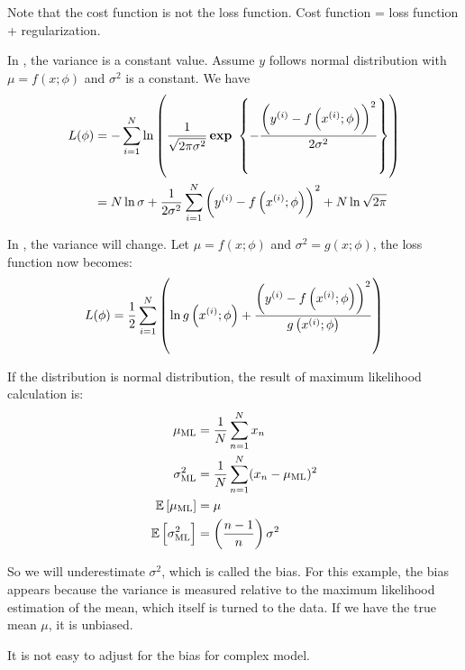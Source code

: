 Note that the cost function is not the loss function. Cost function = loss function + regularization.


In , the variance is a constant value. Assume $y$ follows normal distribution with $\mu = f(x;\phi)$ and $\sigma^2$ is a constant. We have 
\begin{equation}\label{homoscedastic_regression}
    \begin{aligned}
        L(\phi) &= - \sum_{i=1}^N \ln \left( \frac{1}{\sqrt{2\pi \sigma^2}} \mathop{\bf exp\/}~\set{- \frac{\left({y}^{(i)} - f\left({x}^{(i)};\phi\right)\right)^2}{2 \sigma^2}} \right) \\
        &= N \ln \sigma + \frac{1}{2 \sigma^2} \sum_{i=1}^N \left({y}^{(i)} - f\left({x}^{(i)};\phi\right)\right)^2 + N \ln \sqrt{2\pi}
    \end{aligned}
\end{equation}


In , the variance will change. Let $\mu = f(x;\phi)$ and $\sigma^2 = g(x;\phi)$, the loss function now becomes:
\begin{equation}
    L(\phi) = \frac{1}{2} \sum_{i=1}^N \left(\ln g\left({x}^{(i)};\phi\right) + \frac{\left({y}^{(i)} - f\left({x}^{(i)};\phi\right)\right)^2}{ g\left({x}^{(i)};\phi\right)} \right)
\end{equation}


\begin{definition}
    If the distribution is normal distribution, the result of maximum likelihood calculation is:
    \begin{equation}
        \begin{aligned}
            \mu_{\text{ML}} &= \frac{1}{N}\sum_{n=1}^N x_n \\
            \sigma^2_{\text{ML}} &= \frac{1}{N} \sum_{n=1}^N (x_n - \mu_{\text{ML}})^2 \\
            \mathbb{E}\left[{\mu_{\text{ML}}}\right] &= \mu \\
            \mathbb{E}\left[{\sigma^2_{\text{ML}}}\right] &= \left( \frac{n-1}{n} \right) \sigma^2
        \end{aligned}
    \end{equation}
    
    So we will underestimate $\sigma^2$, which is called the bias. For this example, the bias appears because the variance is measured relative to the maximum likelihood estimation of the mean, which itself is turned to the data. If we have the true mean $\mu$, it is unbiased.
    
    It is not easy to adjust for the bias for complex model.
\end{definition}

